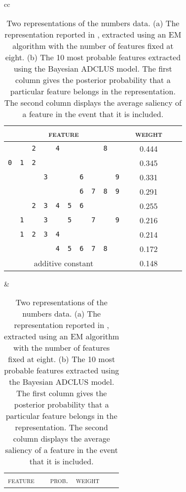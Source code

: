 \documentclass[11pt]{article}
\newcommand{\capspace}{}
\begin{document}
\setlength{\tabcolsep}{2pt}
\begin{table}[t]
\caption{\capspace Two representations of the numbers data. (a) The
representation reported in \protect\cite{tenenbaum96}, extracted using
an EM algorithm with the number of features fixed at eight. (b)
The 10 most probable features extracted using the
Bayesian ADCLUS model. The first column gives the posterior probability
that a particular feature belongs in the representation. The second
column displays the average saliency of a feature in the event that it is
included. \vspace*{-5pt}}
\label{numreps} \begin{center}\footnotesize
  \begin{tabular}{cc}
    \begin{tabular}{cccccccccccccc}\\
      \hline
      \multicolumn{10}{c}{\textsc{feature}}  & &\textsc{weight} \\
      \hline
      & & \texttt{2} & & \texttt{4} & & & & \texttt{8} & & & 0.444 \\[2pt]
      \texttt{0} & \texttt{1} & \texttt{2} & & & & & & &  & & 0.345 \\[2pt]
      & & & \texttt{3} & & & \texttt{6} & & & \texttt{9} & & 0.331 \\[2pt]
      & & & & & & \texttt{6} & \texttt{7} & \texttt{8} & \texttt{9} & & 0.291 \\[2pt]
      & & \texttt{2} & \texttt{3} & \texttt{4} & \texttt{5} & \texttt{6} & & & & & 0.255\\[2pt]
      & \texttt{1} & & \texttt{3} & & \texttt{5} & & \texttt{7} & & \texttt{9} & & 0.216 \\[2pt]
      & \texttt{1} & \texttt{2} & \texttt{3} & \texttt{4} & & & & & & & 0.214 \\[2pt]
      & & & & \texttt{4} & \texttt{5} & \texttt{6} & \texttt{7} & \texttt{8} & & & 0.172 \\[2pt]
      \multicolumn{10}{c}{additive constant} && 0.148 \\
      \hline
    \end{tabular} \hspace{5mm}
    &
    \begin{tabular}{ccccccccccccccc}\\
      \hline
      \multicolumn{10}{c}{\textsc{feature}}  & &\textsc{prob.} & \textsc{weight}\\

\end{tabular}
\end{tabular}
\end{center}
\end{table}
\end{document}
